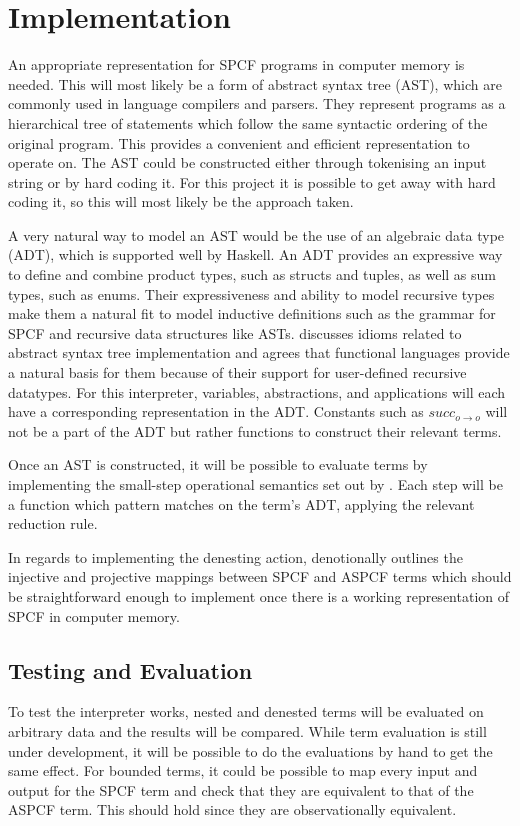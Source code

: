 \documentclass[12pt,a4paper]{report}
\theoremstyle{definition}
\theoremstyle{remark}
\begin{document}
\section{Implementation}
An appropriate representation for SPCF programs in computer memory is needed. This will most likely be a form of abstract syntax tree (AST), which are commonly used in language compilers and parsers. They represent programs as a hierarchical tree of statements which follow the same syntactic ordering of the original program. This provides a convenient and efficient representation to operate on. The AST could be constructed either through tokenising an input string or by hard coding it. For this project it is possible to get away with hard coding it, so this will most likely be the approach taken.

A very natural way to model an AST would be the use of an algebraic data type (ADT), which is supported well by Haskell. An ADT provides an expressive way to define and combine product types, such as structs and tuples, as well as sum types, such as enums. Their expressiveness and ability to model recursive types make them a natural fit to model inductive definitions such as the grammar for SPCF and recursive data structures like ASTs. \cite{jones_2003} discusses idioms related to abstract syntax tree implementation and agrees that functional languages provide a natural basis for them because of their support for user-defined recursive datatypes. For this interpreter, variables, abstractions, and applications will each have a corresponding representation in the ADT. Constants such as $succ_{o \rightarrow o}$ will not be a part of the ADT but rather functions to construct their relevant terms.

Once an AST is constructed, it will be possible to evaluate terms by implementing the small-step operational semantics set out by \cite{laird_2007}. Each step will be a function which pattern matches on the term's ADT, applying the relevant reduction rule.

In regards to implementing the denesting action, \cite{laird_2007} denotionally outlines the injective and projective mappings between SPCF and ASPCF terms which should be straightforward enough to implement once there is a working representation of SPCF in computer memory. 

\subsection{Testing and Evaluation}
To test the interpreter works, nested and denested terms will be evaluated on arbitrary data and the results will be compared. While term evaluation is still under development, it will be possible to do the evaluations by hand to get the same effect. For bounded terms, it could be possible to map every input and output for the SPCF term and check that they are equivalent to that of the ASPCF term. This should hold since they are observationally equivalent. 
\end{document}
